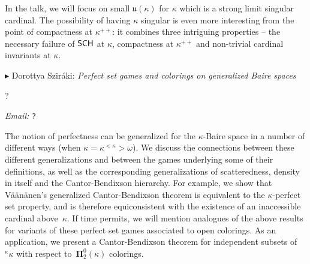 \documentclass[a4paper]{amsart}
\theoremstyle{remark}
\newcommand{\vsp}{\vspace{20pt}}
\begin{document}
In the talk, we will focus on small $\mathfrak{u}(\kappa)$ for $\kappa$ which is a strong limit singular cardinal. The possibility of having $\kappa$ singular is even more interesting from the point of compactness at $\kappa^{++}$: it combines three intriguing properties -- the necessary failure of $\sf SCH
$ at $\kappa$, compactness at $\kappa^{++}$ and non-trivial cardinal invariants at $\kappa$. 











\vsp 

\noindent 
$\blacktriangleright$ Dorottya Szir\'aki: \emph{Perfect set games and colorings on generalized Baire spaces} 

\noindent 
? 

\noindent 
\emph{Email:} \texttt{?} 

The notion of perfectness can be generalized
for the $\kappa$-Baire space
in a number of different ways (when $\kappa=\kappa^{<\kappa}>\omega$). 
We 
discuss
the connections between 
these different generalizations and between 
the games underlying some of their definitions, 
as well as 
the corresponding generalizations of 
scatteredness,
density in itself 
and the Cantor-Bendixson hierarchy.
For example, we show that V\"a\"an\"anen's generalized Cantor-Bendixson theorem is equivalent to the $\kappa$-perfect set property, and is therefore equiconsistent with the existence of an inaccessible cardinal above~$\kappa$. 
If time permits, we will mention 
analogues of the above results
for variants of these
perfect set games associated to open colorings.
As an application, we present 
a Cantor-Bendixson theorem
for independent subsets of ${}^\kappa\kappa$ with respect to~$\mathbf{\Pi}^0_2(\kappa)$ colorings.
\end{document}
